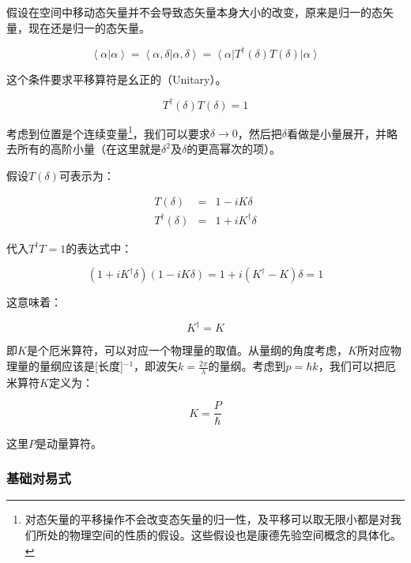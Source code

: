 假设在空间中移动态矢量并不会导致态矢量本身大小的改变，原来是归一的态矢量，现在还是归一的态矢量。

\begin{equation}
\left\langle \alpha | \alpha \right\rangle = \left\langle \alpha, \delta | \alpha, \delta \right\rangle = \left\langle \alpha \right| T^\dagger(\delta) T(\delta) \left| \alpha \right\rangle    
\end{equation}

这个条件要求平移算符是幺正的（Unitary）。

\begin{equation}
T^\dagger (\delta) T (\delta ) =  1
\end{equation}

考虑到位置是个连续变量\footnote{对态矢量的平移操作不会改变态矢量的归一性，及平移可以取无限小都是对我们所处的物理空间的性质的假设。这些假设也是康德先验空间概念的具体化。}，我们可以要求$\delta \to 0$，然后把$\delta$看做是小量展开，并略去所有的高阶小量（在这里就是$\delta^2$及$\delta$的更高幂次的项）。

假设$T(\delta)$可表示为：

\begin{eqnarray}
T(\delta) & = & 1- i K \delta \\
T^\dagger (\delta) & = & 1+ i K^\dagger \delta
\end{eqnarray}

代入$T^\dagger T =1$的表达式中：

\begin{equation*}
\left( 1+ i K^\dagger \delta \right) \left( 1- i K \delta \right) = 1 + i \left( K^\dagger - K \right) \delta = 1
\end{equation*}

这意味着：

\begin{equation}
K^\dagger = K
\end{equation}

即$K$是个厄米算符，可以对应一个物理量的取值。从量纲的角度考虑，$K$所对应物理量的量纲应该是[长度]$^{-1}$，即波矢$k = \frac{2 \pi}{ \lambda }$的量纲。考虑到$p = \hbar k$，我们可以把厄米算符$K$定义为：

\begin{equation}
K = \frac{P}{\hbar}
\end{equation}

这里$P$是动量算符。

\subsubsection{基础对易式}

